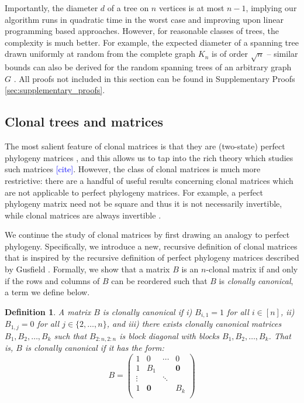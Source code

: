 \documentclass[10pt]{article}
\newtheorem{definition}{Definition}
\newcommand{\henri}[1]{\textcolor{blue}{[#1]}}
\begin{document}
Importantly, the diameter $d$ of a tree on $n$ vertices is at most $n - 1$, implying our algorithm 
runs in quadratic time in the worst case and improving upon linear programming based approaches. 
However, for reasonable classes of trees, the complexity is much better. For example, the expected
diameter of a spanning tree drawn uniformly at random from the complete graph $K_n$ is 
of order $\sqrt{n}$ -- similar bounds can also be derived 
for the random spanning trees of an arbitrary graph $G$ \cite{renyi_height_1967, chung_diameter_2012}.
All proofs not included in this section can be found in
Supplementary Proofs \ref{sec:supplementary_proofs}.


\subsection{Clonal trees and matrices}
\label{sec:clonal-trees-matrices}

The most salient feature of clonal matrices is that they are (two-state) perfect phylogeny matrices 
\cite{el-kebir_reconstruction_2015}, and this allows us to tap into the rich theory 
which studies such matrices \henri{cite}.
However, the class of clonal matrices is much more restrictive:
there are a handful of useful results concerning clonal matrices 
which are not applicable to perfect phylogeny matrices.
For example, a perfect phylogeny matrix need
not be square and thus it is not necessarily invertible, while clonal matrices are 
always invertible \cite{el-kebir_reconstruction_2015}. 

We continue the study of clonal matrices by first drawing an analogy to perfect phylogeny. 
Specifically, we introduce a new, recursive definition
of clonal matrices that is inspired by the recursive definition of perfect
phylogeny matrices described by Gusfield \cite{gusfield_efficient_1991, peer_incomplete_2000}. Formally,
we show that a matrix $B$ is an $n$-clonal matrix if and only if
the rows and columns of $B$ can be reordered such that $B$ is \emph{clonally canonical},
a term we define below.

\begin{definition}
    A matrix $B$ is clonally canonical if i) $B_{i, 1} = 1$ for all $i \in [n]$,
    ii) $B_{1, j} = 0$ for all $j \in \{2, \ldots, n\}$, and iii) there exists 
    clonally canonical matrices $B_1, B_2, \ldots, B_k$ such that $B_{2:n , 2:n}$ is
    block diagonal with blocks $B_1, B_2, \ldots, B_k$. That is, $B$ is clonally canonical
    if it has the form:
    \[B= \left(\begin{array}{c|ccc}
        1 & 0 & \cdots & 0\\
        \hline
        1 & B_1 & & \mathbf{0} \\
        \vdots & & \ddots & \\
        1 & \mathbf{0} & & B_k \\
    \end{array}\right)\]
\end{definition}
\end{document}
